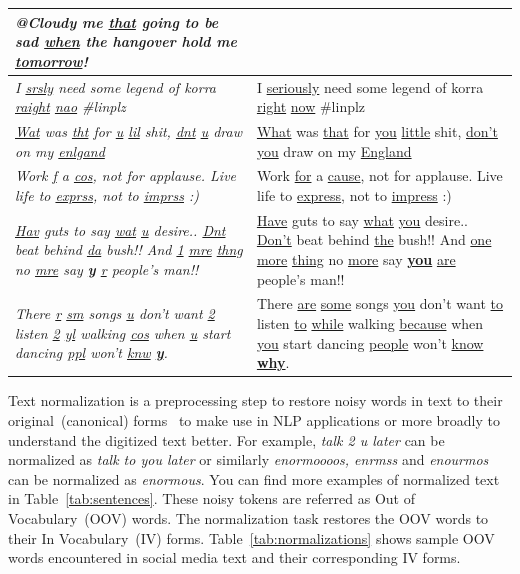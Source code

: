 \documentclass[a4paper,onesided,12pt]{report}
\begin{document}
\begin{table}[hbp]
\begin{tabular}{|>{\itshape}p{7cm}|p{7cm}|}
@Cloudy me \underline{that} going to be sad \underline{when} the hangover hold me \underline{tomorrow}! \\
\hline
I \underline{srsly} need some legend of korra \underline{raight} \underline{nao} \#linplz &
I \underline{seriously} need some legend of korra \underline{right} \underline{now} \#linplz \\
\hline
\underline{Wat} was \underline{tht} for \underline{u} \underline{lil} shit, \underline{dnt} \underline{u} draw on my \underline{enlgand} &
\underline{What} was \underline{that} for \underline{you} \underline{little} shit, \underline{don’t} \underline{you} draw on my \underline{England} \\ \hline
Work \underline{f} a \underline{cos}, not for applause. Live life to \underline{exprss}, not to \underline{imprss} :) & Work \underline{for} a \underline{cause}, not for applause. Live life to \underline{express}, not to \underline{impress} :) \\
\underline{Hav} guts to say \underline{wat} \underline{u} desire.. \underline{Dnt} beat behind \underline{da} bush!! And \underline{1} \underline{mre} \underline{thng} no \underline{mre} say \textbf{\underline{y}} \underline{r} people's man!! &
\underline{Have} guts to say \underline{what} \underline{you} desire.. \underline{Don’t} beat behind \underline{the} bush!! And \underline{one} \underline{more} \underline{thing} no \underline{more} say \textbf{\underline{you}} \underline{are} people's man!! \\
\hline
There \underline{r} \underline{sm} songs \underline{u} don't want \underline{2} listen \underline{2} \underline{yl} walking \underline{cos} when \underline{u} start dancing \underline{ppl} won't \underline{knw} \textbf{\underline{y}}. &
There \underline{are} \underline{some} songs \underline{you} don't want \underline{to} listen \underline{to} \underline{while} walking \underline{because} when \underline{you} start dancing \underline{people} won't \underline{know} \textbf{\underline{why}}. \\
\hline
\end{tabular}
\end{table}

Text normalization is a preprocessing step to restore noisy words in text to their original~(canonical) forms~\cite{Han:2011:LNS:2002472.2002520} to make use in NLP applications or more broadly to understand the digitized text better. For example, \textit{talk 2 u later} can be normalized as \textit{talk to you later} or similarly \textit{enormoooos, enrmss} and \textit{enourmos} can be normalized as \textit{enormous}. You can find more examples of normalized text in Table~\ref{tab:sentences}. These noisy tokens are referred as Out of Vocabulary~(OOV) words. The normalization task restores the OOV words to their In Vocabulary~(IV) forms. Table~\ref{tab:normalizations} shows sample OOV words encountered in social media text and their corresponding IV forms.
\end{document}
